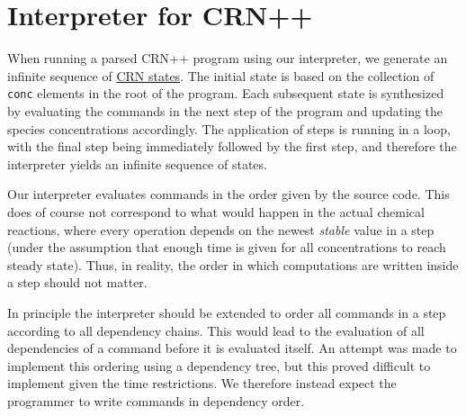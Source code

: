 \section{Interpreter for CRN++}\label{sec:interpreter} %
When running a parsed CRN++ program using our interpreter, we generate an infinite sequence of \hyperref[sec:states]{CRN states}. The initial state is based on the collection of \texttt{conc} elements in the root of the program. Each subsequent state is synthesized by evaluating the commands in the next step of the program and updating the species concentrations accordingly. The application of steps is running in a loop, with the final step being immediately followed by the first step, and therefore the interpreter yields an infinite sequence of states.

Our interpreter evaluates commands in the order given by the source code. This does of course not correspond to what would happen in the actual chemical reactions, where every operation depends on the newest \textit{stable} value in a step (under the assumption that enough time is given for all concentrations to reach steady state). Thus, in reality, the order in which computations are written inside a step should not matter.

In principle the interpreter should be extended to order all commands in a step according to all dependency chains. This would lead to the evaluation of all dependencies of a command before it is evaluated itself. An attempt was made to implement this ordering using a dependency tree, but this proved difficult to implement given the time restrictions. We therefore instead expect the programmer to write commands in dependency order.